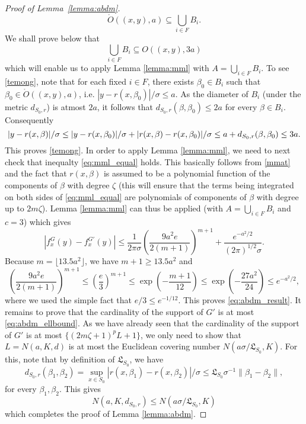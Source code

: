 \documentclass[11pt]{article}
\numberwithin{equation}{section}
\newcommand{\dbeta}{d_{S_0,r}}
\newcommand{\lipsz}{\mathfrak{L}}
\begin{document}
\begin{appendices}
\begin{proof}[Proof of Lemma~\ref{lemma:abdm}]
\[
\mathring{O}((x,y),a) \subseteq \bigcup_{i\in F} B_i.
\]
We shall prove below that 
\begin{equation}\label{temong}
\bigcup_{i\in F} B_i \subseteq O((x,y), 3a) 
\end{equation}
which will enable us to apply Lemma \ref{lemma:mml} with $A = \bigcup_{i \in F} B_i$. To see \eqref{temong}, note that for each fixed $i \in F$, there exists $\beta_0 \in B_i$ such that $\beta_0 \in \mathring{O}((x,y),a)$, i.e. $|y - r(x, \beta_0)|/\sigma \leq a$. As the diameter of $B_i$ (under the metric $\dbeta$) is atmost $2a$, it follows  that $\dbeta(\beta, \beta_0) \leq 2a$ for every $\beta \in B_i$. Consequently
\[
| y - r(x,\beta)|/\sigma  \leq | y - r(x, \beta_0)|/\sigma + | r(x, \beta) - r(x, \beta_0) |/\sigma \\
\leq a + \dbeta(\beta,\beta_0) \leq 3a.
\]
This proves \eqref{temong}. In order to apply Lemma \ref{lemma:mml}, we need to next check that inequalty \eqref{eq:mml_equal} holds. This basically follows from \eqref{mmat} and the fact that $r(x, \beta)$ is assumed to be a polynomial function of the components of $\beta$ with degree $\zeta$ (this will ensure that the terms being integrated on both sides of \eqref{eq:mml_equal} are polynomials of components of $\beta$ with degree up to $2m\zeta$). Lemma \ref{lemma:mml} can thus be applied (with $A = \bigcup_{i \in F} B_i$ and $c = 3$) which gives 
\[
|f^G_x(y) - f^{G'}_x(y)|\leq \frac{1}{2 \pi \sigma} \left( \frac{9a^2e}{2(m+1)}\right)^{m+1}   + \frac{e^{-a^2/2}}{(2\pi)^{1/2}\sigma}.
\]
Because $m= \lfloor 13.5a^2\rfloor$, we have $m+1 \geq 13.5 a^2$ and
\[ 
\left( \frac{9 a^2 e}{2(m+1)}\right)^{m+1} \leq \left(\frac{e}{3}\right)^{m+1} \leq \exp( - \frac{m+1}{12}) \leq \exp\left(-\frac{27 a^2}{24}\right) \leq e^{-a^2/2},
\]
where we used the simple fact that $e/3\leq e^{-1/12}$. This proves \eqref{eq:abdm_result}. It remains to prove that the cardinality of the support of $G'$ is at most \eqref{eq:abdm_ellbound}. As we have already seen that the cardinality of the support of $G'$ is at most $\{(2m\zeta +1)^pL+1\}$, we only need to show that $L= N(a, K,d)$ is at most the Euclidean covering number $N(a \sigma/\lipsz_{S_0}, K)$. For this, note that by definition of $\lipsz_{S_0}$, we have
\begin{equation*}
\dbeta(\beta_1,\beta_2) = \sup_{x\in S_0} | r(x,\beta_1) - r(x,\beta_2) |/\sigma \leq \lipsz_{S_0} \sigma^{-1}\| \beta_1 - \beta_2\|,
\end{equation*}
for every $\beta_1, \beta_2$. This gives
\begin{equation}\label{dbeuc} 
N(a, K, \dbeta) \leq N(a \sigma/\lipsz_{S_0}, K)  
\end{equation}
which completes the proof of Lemma \ref{lemma:abdm}. 
\end{proof}


\end{appendices}
\end{document}
